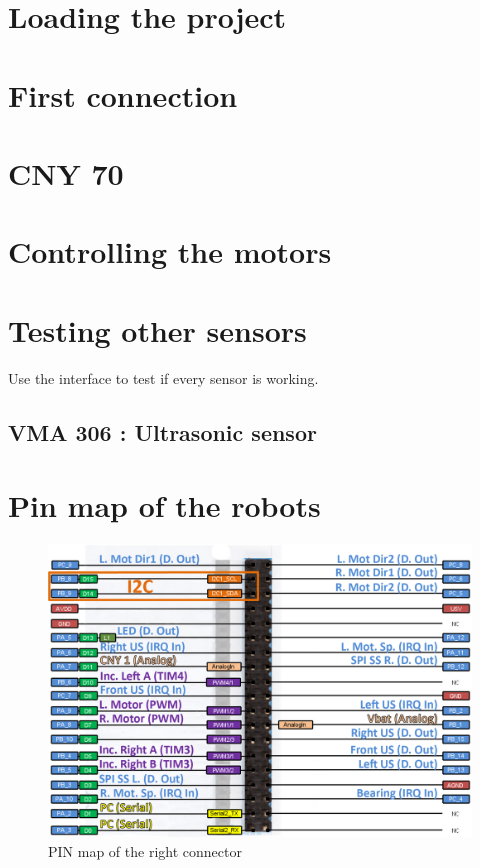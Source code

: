 \documentclass[11pt,english]{article}
\begin{document}
\UPSTIbuildPage

\tableofcontents
\pagebreak
\section{Loading the project}

\section{First connection}

\pagebreak
\section{CNY 70}


\pagebreak
\section{Controlling the motors}


\pagebreak
\section{Testing other sensors}
\begin{UPSTIactivite}
 Use the interface to test if every sensor is working.
\end{UPSTIactivite}

\subsection{VMA 306 : Ultrasonic sensor}

%

\section{Pin map of the robots}
\begin{figure}
 \centering
 \includegraphics[width=\textwidth]{images/right_connectors}
 \caption{PIN map of the right connector}
 \label{fig:right_connector}
\end{figure}
\end{document}
